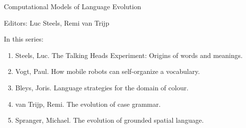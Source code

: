 {\large Computational Models of Language Evolution}

\bigskip

Editors: Luc Steels, Remi van Trijp

\bigskip

In this series:

\begin{enumerate}
\item Steels, Luc. The Talking Heads Experiment: Origins of words and meanings.
\item Vogt, Paul. How mobile robots can self-organize a vocabulary.
\item Bleys, Joris. Language strategies for the domain of colour.
\item van Trijp, Remi. The evolution of case grammar.
\item Spranger, Michael. The evolution of grounded spatial language.
\end{enumerate}


